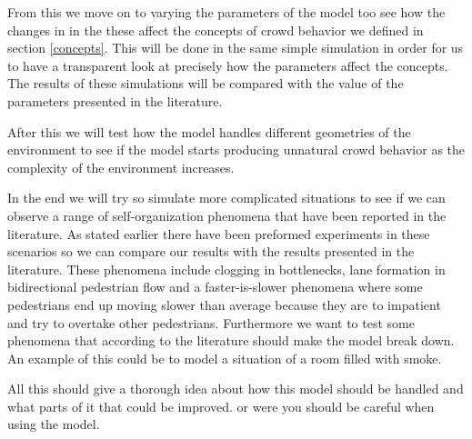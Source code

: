 From this we move on to varying the parameters of the model too see how the changes in 
in the these affect the concepts of crowd behavior we defined in section \ref{concepts}. 
This will be done in the same simple simulation in order for us to have a transparent look 
at precisely how the parameters affect the concepts. The results of these simulations 
will be compared with the value of the parameters presented in the literature.

After this we will test how the model handles different geometries of the environment 
to see if the model starts producing unnatural crowd behavior as the complexity of the 
environment increases. 

In the end we will try so simulate more complicated situations to see if we can observe 
a range of self-organization phenomena that have been reported in the literature. As 
stated earlier there have been preformed experiments in these scenarios so we can 
compare our results with the results presented in the literature. These phenomena 
include clogging in bottlenecks, lane formation in bidirectional pedestrian 
flow and a faster-is-slower phenomena where some pedestrians end up moving slower than 
average because they are to impatient and try to overtake other pedestrians\cite{self-org}. 
Furthermore we want to test some phenomena  that according to the literature should make 
the model break down. An example of this could be to model a situation of a room filled 
with smoke.   

All this should give a thorough idea about how this model should be handled and what parts 
of it that could be improved. or were you should be careful when using the model.

